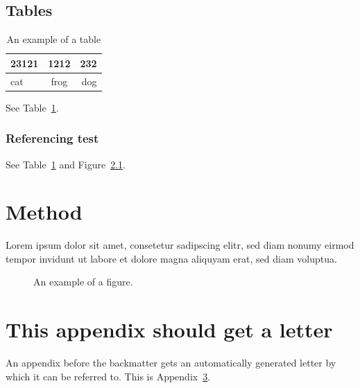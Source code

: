 \documentclass[a4paper,11pt,phdthesis,singlespace,twoside]{cssethesis}
\begin{document}
\section{Tables}
\begin{table}
\begin{center}
\begin{tabular}{lcr}
23121 & 1212 & 232 \\ \hline  
cat & frog & dog
\end{tabular}
\end{center}
\caption{An example of a table}
\label{tab:example}
\end{table}
See Table~\ref{tab:example}.

\subsection{Referencing test}
See Table~\ref{tab:example} and Figure~\ref{fig:example}.

\chapter{Method}
Lorem ipsum dolor sit amet, consetetur sadipscing elitr,  sed diam nonumy
eirmod tempor invidunt ut labore et dolore magna aliquyam erat, sed diam
voluptua. 

\begin{figure}[ht]
\begin{center}
\end{center}
\caption{An example of a figure.}
\label{fig:example}
\end{figure}

\appendix %

\chapter{This appendix should get a letter}
\label{app:example}
An appendix before the backmatter gets an automatically generated letter by
which it can be referred to. This is Appendix~\ref{app:example}.
\end{document}
